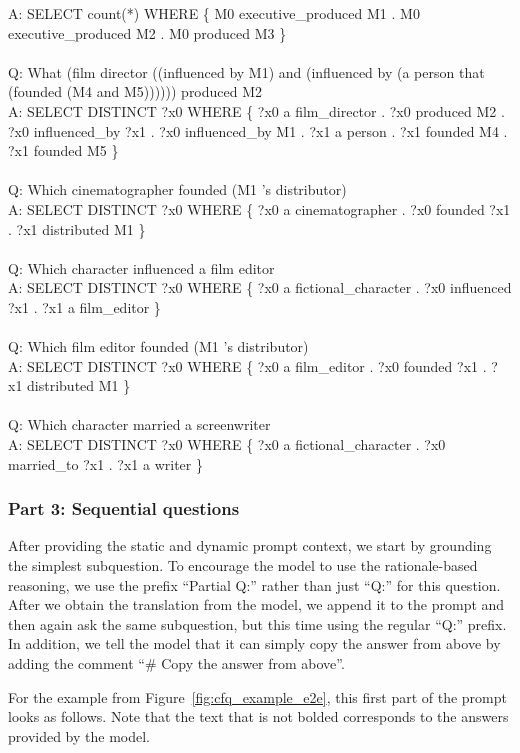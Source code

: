 \documentclass{article} \usepackage{iclr2022_conference,times}
\begin{document}
{A: SELECT count(*) WHERE \{ M0 executive\_produced M1 . M0 executive\_produced M2 . M0 produced M3 \} \\
 \\
Q: What (film director ((influenced by M1) and (influenced by (a person that (founded (M4 and M5)))))) produced M2 \\
A: SELECT DISTINCT ?x0 WHERE \{ ?x0 a film\_director . ?x0 produced M2 . ?x0 influenced\_by ?x1 . ?x0 influenced\_by M1 . ?x1 a person . ?x1 founded M4 . ?x1 founded M5 \} \\
 \\
Q: Which cinematographer founded (M1 's distributor) \\
A: SELECT DISTINCT ?x0 WHERE \{ ?x0 a cinematographer . ?x0 founded ?x1 . ?x1 distributed M1 \} \\
 \\
Q: Which character influenced a film editor \\
A: SELECT DISTINCT ?x0 WHERE \{ ?x0 a fictional\_character . ?x0 influenced ?x1 . ?x1 a film\_editor \} \\
 \\
Q: Which film editor founded (M1 's distributor) \\
A: SELECT DISTINCT ?x0 WHERE \{ ?x0 a film\_editor . ?x0 founded ?x1 . ?x1 distributed M1 \} \\
 \\
Q: Which character married a screenwriter \\
A: SELECT DISTINCT ?x0 WHERE \{ ?x0 a fictional\_character . ?x0 married\_to ?x1 . ?x1 a writer \}
}

\subsubsection{Part 3: Sequential questions}
After providing the static and dynamic prompt context, we start by grounding the simplest subquestion. To encourage the model to use the rationale-based reasoning, we use the prefix ``Partial Q:'' rather than just ``Q:'' for this question. After we obtain the translation from the model, we append it to the prompt and then again ask the same subquestion, but this time using the regular ``Q:'' prefix. In addition, we tell the model that it can simply copy the answer from above by adding the comment ``\# Copy the answer from above''.

For the example from Figure~\ref{fig:cfq_example_e2e}, this first part of the prompt looks as follows. Note that the text that is not bolded corresponds to the answers provided by the model.
\end{document}
